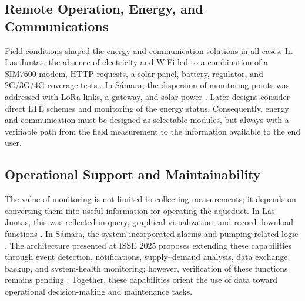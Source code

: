 \documentclass[conference]{IEEEtran}
\begin{document}
\subsection{Remote Operation, Energy, and Communications}
Field conditions shaped the energy and communication solutions in all cases. In Las Juntas, the absence of electricity and WiFi led to a combination of a SIM7600 modem, HTTP requests, a solar panel, battery, regulator, and 2G/3G/4G coverage tests \cite{chavarria2021implementacion}. In Sámara, the dispersion of monitoring points was addressed with LoRa links, a gateway, and solar power \cite{solorzano2021sistema}. Later designs consider direct LTE schemes and monitoring of the energy status. Consequently, energy and communication must be designed as selectable modules, but always with a verifiable path from the field measurement to the information available to the end user.

\subsection{Operational Support and Maintainability}
The value of monitoring is not limited to collecting measurements; it depends on converting them into useful information for operating the aqueduct. In Las Juntas, this was reflected in query, graphical visualization, and record-download functions \cite{chavarria2021implementacion}. In Sámara, the system incorporated alarms and pumping-related logic \cite{solorzano2021sistema}. The architecture presented at ISSE 2025 proposes extending these capabilities through event detection, notifications, supply--demand analysis, data exchange, backup, and system-health monitoring; however, verification of these functions remains pending \cite{arguedas2025towards}. Together, these capabilities orient the use of data toward operational decision-making and maintenance tasks.
\end{document}
